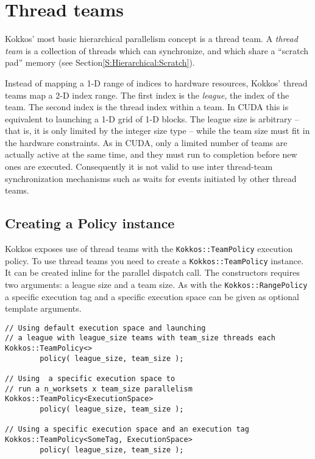 \section{Thread teams}\label{S:Hierarchical:Teams}

Kokkos' most basic hierarchical parallelism concept is a thread team.
A \emph{thread team} is a collection of threads which can synchronize,
and which share a ``scratch pad'' memory
(see Section\ref {S:Hierarchical:Scratch}).

Instead of mapping a 1-D range of indices to hardware resources,
Kokkos' thread teams map a 2-D index range.
The first index is the \emph{league}, the index of the team.
The second index is the thread index within a team.
In CUDA this is equivalent to launching a 1-D grid of 1-D blocks.
The league size is arbitrary -- that is, it is only limited by the integer size type -- while the team size must fit in the hardware constraints.
As in CUDA, only a limited number of teams are actually active at the same time,
and they must run to completion before new ones are executed. 
Consequently it is not valid to use inter thread-team synchronization mechanisms
such as waits for events initiated by other thread teams. 

\subsection{Creating a Policy instance}\label{SS:Hierarchical:Teams:Policy}

Kokkos exposes use of thread teams with the \lstinline!Kokkos::TeamPolicy! execution policy.
To use thread teams you need to create a \lstinline|Kokkos::TeamPolicy| instance.
It can be created inline for the parallel dispatch call.
The constructors requires two arguments: a league size and a team size. 
As with the  \lstinline|Kokkos::RangePolicy| a specific execution tag and a specific execution space can be given as optional template arguments.
\begin{lstlisting}
// Using default execution space and launching 
// a league with league_size teams with team_size threads each
Kokkos::TeamPolicy<> 
        policy( league_size, team_size ); 

// Using  a specific execution space to 
// run a n_worksets x team_size parallelism
Kokkos::TeamPolicy<ExecutionSpace> 
        policy( league_size, team_size );

// Using a specific execution space and an execution tag 
Kokkos::TeamPolicy<SomeTag, ExecutionSpace> 
        policy( league_size, team_size ); 
\end{lstlisting}
 
